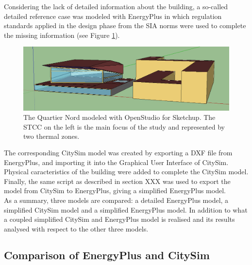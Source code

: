 \documentclass{tBPS2e}
\theoremstyle{plain}
\theoremstyle{definition}
\theoremstyle{remark}
\begin{document}
Considering the lack of detailed information about the building, a so-called detailed reference case was modeled with EnergyPlus \citep{Mauree:2015} in which regulation standards applied in the design phase from the SIA norms were used to complete the missing information (see Figure \ref{fig:model_yang}).

\begin{figure}[H]
\centering
\includegraphics[width=\textwidth]{figures/model_yang}
\caption{The Quartier Nord modeled with OpenStudio for Sketchup. The STCC on the left is the main focus of the study and represented by two thermal zones.}
\label{fig:model_yang}
\end{figure}

The corresponding CitySim model was created by exporting a DXF file from EnergyPlus, and importing it into the Graphical User Interface of CitySim. Physical caracteristics of the building were added to complete the CitySim model. Finally, the same script as described in section XXX was used to export the model from CitySim to EnergyPlus, giving a simplified EnergyPlus model.\\
As a summary, three models are compared: a detailed EnergyPlus model, a simplified CitySim model and a simplified EnergyPlus model. In addition to what a coupled simplified CitySim and EnergyPlus model is realised and its results analysed with respect to the other three models. 


\subsection{Comparison of EnergyPlus and CitySim}
\end{document}
